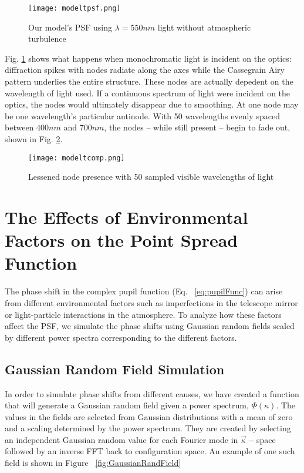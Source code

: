 \documentclass[%
 reprint,
 amsmath,amssymb,
 aps,
 pra,
]{revtex4-1}
\begin{document}
{\begin{figure}[!ht]
    \centering
    \texttt{[image: modeltpsf.png]}
    \caption{Our model's PSF using $\lambda = 550nm$ light without atmospheric turbulence}
    \label{fig:modelpsf-no-turb}
\end{figure}

Fig. \ref{fig:modelpsf-no-turb} shows what happens when monochromatic light is incident on the optics: diffraction spikes with nodes radiate along the axes while the Cassegrain Airy pattern underlies the entire structure. These nodes are actually depedent on the wavelength of light used. If a continuous spectrum of light were incident on the optics, the nodes would ultimately disappear due to smoothing. At one node may be one wavelength's particular antinode. With 50 wavelengths evenly spaced between $400nm$ and $700nm$, the nodes -- while still present -- begin to fade out, shown in Fig. \ref{fig:modeltcomp}.

\begin{figure}[!ht]
    \centering
        \texttt{[image: modeltcomp.png]}
    \caption{Lessened node presence with 50 sampled visible wavelengths of light}
    \label{fig:modeltcomp}
\end{figure}

\section{The Effects of Environmental Factors on the Point Spread Function} \label{sec:environment}

The phase shift in the complex pupil function (Eq. ~\ref{eq:pupilFunc}) can arise from different environmental factors such as imperfections in the telescope mirror or light-particle interactions in the atmosphere. To analyze how these factors affect the PSF, we simulate the phase shifts using Gaussian random fields scaled by different power spectra corresponding to the different factors.

\subsection{Gaussian Random Field Simulation} \label{subsec:gaussian-fields}
In order to simulate phase shifts from different causes, we have created a function that will generate a Gaussian random field given a power spectrum, $\Phi(\kappa)$. The values in the fields are selected from Gaussian distributions with a mean of zero and a scaling determined by the power spectrum. They are created by selecting an independent Gaussian random value for each Fourier mode in $\vec{\kappa}-$space followed by an inverse FFT back to configuration space. An example of one such field is shown in Figure ~\ref{fig:GaussianRandField}

}
\end{document}
